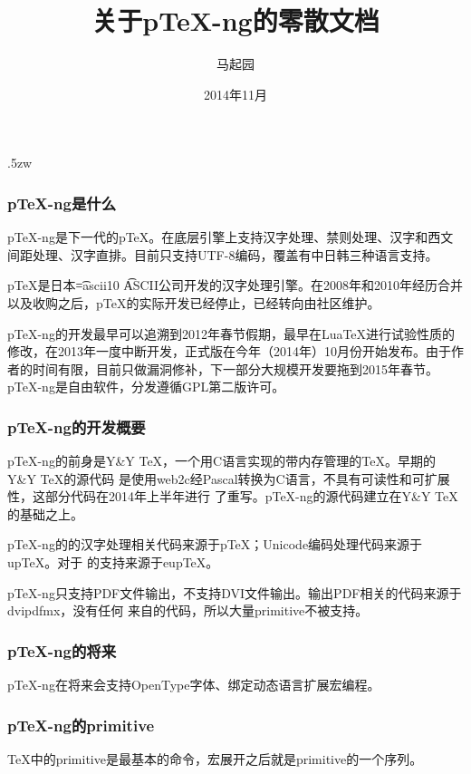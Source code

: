 \documentclass[dvipdfmx]{beamer}
\begin{document}
\title{\bf 关于p\TeX-ng的零散文档}
\author{马起园}
\date{2014年11月}
\begin{frame}
\maketitle
\end{frame}
%
\parskip.5zw
\begin{frame}[fragile]
\frametitle{\bf p\TeX-ng是什么}
p\TeX-ng是下一代的p\TeX。在底层引擎上支持汉字处理、禁则处理、汉字和西文间距处理、汉字直排。目前只支持UTF-8编码，覆盖有中日韩三种语言支持。

p\TeX 是日本{\font\t=ascii10 \t ASCII}公司开发的汉字处理引擎。在2008年和2010年经历合并以及收购之后，p\TeX 的实际开发已经停止，已经转向由社区维护。

p\TeX-ng的开发最早可以追溯到2012年春节假期，最早在Lua\TeX 进行试验性质的修改，在2013年一度中断开发，正式版在今年（2014年）10月份开始发布。由于作者的时间有限，目前只做漏洞修补，下一部分大规模开发要拖到2015年春节。p\TeX-ng是自由软件，分发遵循GPL第二版许可。
\end{frame}
%
\begin{frame}[fragile]
\frametitle{\bf p\TeX-ng的开发概要}
p\TeX-ng的前身是Y\&Y \TeX，一个用C语言实现的带内存管理的\TeX。早期的Y\&Y \TeX 的源代码
是使用web2c经Pascal转换为C语言，不具有可读性和可扩展性，这部分代码在2014年上半年进行
了重写。p\TeX-ng的源代码建立在Y\&Y \TeX 的基础之上。

p\TeX-ng的的汉字处理相关代码来源于p\TeX；Unicode编码处理代码来源于up\TeX。对于
的支持来源于eup\TeX。

p\TeX-ng只支持PDF文件输出，不支持DVI文件输出。输出PDF相关的代码来源于dvipdfmx，没有任何
来自的代码，所以大量primitive不被支持。
\end{frame}
%
\begin{frame}[fragile]
\frametitle{\bf p\TeX-ng的将来}
p\TeX-ng在将来会支持OpenType字体、绑定动态语言扩展宏编程。
\end{frame}
%
\begin{frame}[fragile]
\frametitle{\bf p\TeX-ng的primitive}
\TeX 中的primitive是最基本的命令，宏展开之后就是primitive的一个序列。
\end{frame}
\end{document}

